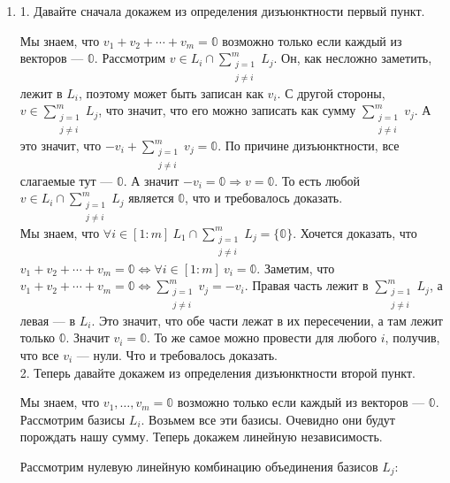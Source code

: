 \begin{enumerate}
    \item[]\prooff{}
          1. Давайте сначала докажем из определения дизъюнктности первый пункт.

          \fbox{\(\Rightarrow\)}  Мы знаем, что $v_1+v_2+\cdots+v_m=\mathbb{0}$ возможно только если каждый из векторов --- $\mathbb{0}$. Рассмотрим $v\in L_i\cap\sum\limits_{\substack{j=1\\j\neq i}}^mL_j$. Он, как несложно заметить, лежит в $L_i$, поэтому может быть записан как $v_i$. С другой стороны, $v\in\sum\limits_{\substack{j=1\\j\neq i}}^mL_j$, что значит, что его можно записать как сумму $\sum\limits_{\substack{j=1\\j\neq i}}^mv_j$. А это значит, что $-v_i+\sum\limits_{\substack{j=1\\j\neq i}}^mv_j=\mathbb{0}$. По причине дизъюнктности, все слагаемые тут --- $\mathbb{0}$. А значит $-v_i=\mathbb{0}\Rightarrow v=\mathbb{0}$. То есть любой $v\in L_i\cap\sum\limits_{\substack{j=1\\j\neq i}}^mL_j$ является $\mathbb{0}$, что и требовалось доказать.\\

          \fbox{\(\Leftarrow\)}  Мы знаем, что $\forall i\in[1:m]~L_1\cap\sum\limits_{\substack{j=1\\j\neq i}}^mL_j=\{\mathbb{0}\}$. Хочется доказать, что $v_1+v_2+\cdots+v_m=\mathbb{0}\Leftrightarrow\forall i\in[1:m]~v_i=\mathbb{0}$. Заметим, что $v_1+v_2+\cdots+v_m=\mathbb{0}\Leftrightarrow\sum\limits_{\substack{j=1\\j\neq i}}^m v_j=-v_i$. Правая часть лежит в $\sum\limits_{\substack{j=1\\j\neq i}}^mL_j$, а левая --- в $L_i$. Это значит, что обе части лежат в их пересечении, а там лежит только $\mathbb{0}$. Значит $v_i=\mathbb{0}$. То же самое можно провести для любого $i$, получив, что все $v_i$ --- нули. Что и требовалось доказать.\\


          2. Теперь давайте докажем из определения дизъюнктности второй пункт.

          Мы знаем, что $v_1,\ldots, v_m=\mathbb{0}$ возможно только если каждый из векторов  --- $\mathbb{0}$. Рассмотрим базисы $L_i$. Возьмем все эти базисы. Очевидно они будут порождать нашу сумму. Теперь докажем линейную независимость.

          Рассмотрим нулевую линейную комбинацию объединения базисов $L_j$:


\end{enumerate}
